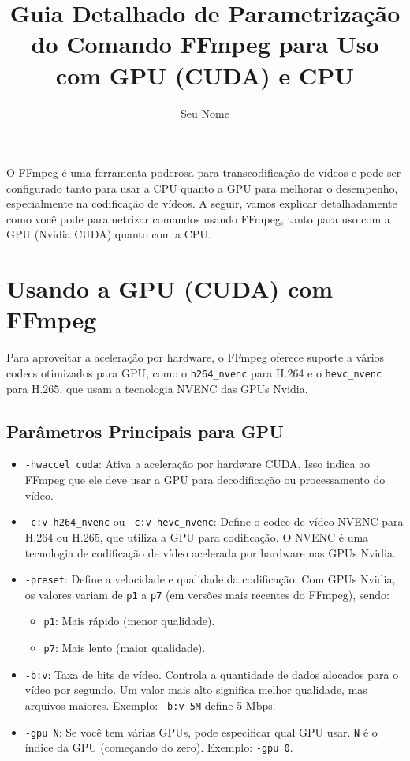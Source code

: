 \documentclass{article}
\title{Guia Detalhado de Parametrização do Comando FFmpeg para Uso com GPU (CUDA) e CPU}
\author{Seu Nome}
\date{}
\begin{document}
\maketitle

O FFmpeg é uma ferramenta poderosa para transcodificação de vídeos e pode ser configurado tanto para usar a CPU quanto a GPU para melhorar o desempenho, especialmente na codificação de vídeos. A seguir, vamos explicar detalhadamente como você pode parametrizar comandos usando FFmpeg, tanto para uso com a GPU (Nvidia CUDA) quanto com a CPU.

\section{Usando a GPU (CUDA) com FFmpeg}

Para aproveitar a aceleração por hardware, o FFmpeg oferece suporte a vários codecs otimizados para GPU, como o \texttt{h264\_nvenc} para H.264 e o \texttt{hevc\_nvenc} para H.265, que usam a tecnologia NVENC das GPUs Nvidia.

\subsection{Parâmetros Principais para GPU}

\begin{itemize}
    \item \texttt{-hwaccel cuda}: Ativa a aceleração por hardware CUDA. Isso indica ao FFmpeg que ele deve usar a GPU para decodificação ou processamento do vídeo.
    
    \item \texttt{-c:v h264\_nvenc} ou \texttt{-c:v hevc\_nvenc}: Define o codec de vídeo NVENC para H.264 ou H.265, que utiliza a GPU para codificação. O NVENC é uma tecnologia de codificação de vídeo acelerada por hardware nas GPUs Nvidia.
    
    \item \texttt{-preset}: Define a velocidade e qualidade da codificação. Com GPUs Nvidia, os valores variam de \texttt{p1} a \texttt{p7} (em versões mais recentes do FFmpeg), sendo:
    \begin{itemize}
        \item \texttt{p1}: Mais rápido (menor qualidade).
        \item \texttt{p7}: Mais lento (maior qualidade).
    \end{itemize}
    
    \item \texttt{-b:v}: Taxa de bits de vídeo. Controla a quantidade de dados alocados para o vídeo por segundo. Um valor mais alto significa melhor qualidade, mas arquivos maiores. Exemplo: \texttt{-b:v 5M} define 5 Mbps.
    
    \item \texttt{-gpu N}: Se você tem várias GPUs, pode especificar qual GPU usar. \texttt{N} é o índice da GPU (começando do zero). Exemplo: \texttt{-gpu 0}.
\end{itemize}
\end{document}
